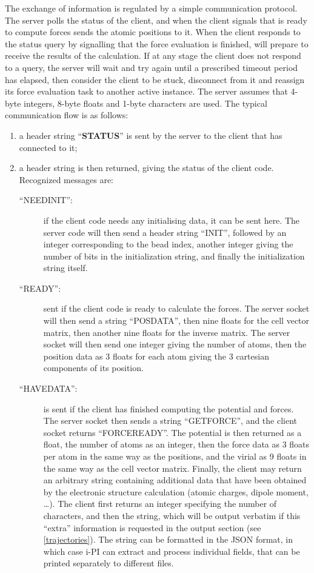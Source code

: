 \documentclass[11pt,english,fleqn]{report}
\begin{document}
The exchange of information is regulated by a simple 
communication protocol. The server polls the status of the client,
and when the client signals that is ready to compute forces 
\ipi sends the atomic positions to it. When the client responds to the
status query by signalling that the force evaluation is finished,
\ipi will prepare to receive the results of the calculation.
 If at any stage the client does not respond to a query, the server 
will wait and try again until a prescribed timeout period has elapsed, 
then consider the client to be stuck, disconnect from it 
and reassign its force evaluation task to another active instance. 
The server assumes that 4-byte integers, 8-byte floats
and 1-byte characters are used. The typical communication flow is
as follows:
%
\begin{enumerate}
\item a header string {}``\textbf{STATUS}'' is sent by the server to 
the client that has connected to it;
\item a header string is then returned, giving the status of the client
code. Recognized messages are:
\begin{description}
\item [{{}``NEEDINIT'':}] if the client code needs any initialising data,
it can be sent here. The server code will then send a header string
{}``INIT'', followed by an integer corresponding to the bead index,
another integer giving the number of bits in
the initialization string, and finally the initialization string itself.
\item [{{}``READY'':}] sent if the client code is ready to calculate
the forces. The server socket will then send a string {}``POSDATA'',
then nine floats for the cell vector matrix, then another nine floats
for the inverse matrix. The server socket will then send one
integer giving the number of atoms, then the position data as 3 floats
for each atom giving the 3 cartesian components of its position.
\item [{{}``HAVEDATA'':}] is sent if the client has finished computing the
potential and forces. The server socket then sends a string {}``GETFORCE'',
and the client socket returns {}``FORCEREADY''. The potential is
then returned as a float, the number of atoms as an integer, then
the force data as 3 floats per atom in the same way as the positions,
and the virial as 9 floats in the same way as the cell vector matrix. 
Finally, the client may return an arbitrary string containing additional
data that have been obtained by the electronic structure calculation 
(atomic charges, dipole moment, \ldots). The client first returns
an integer specifying the number of characters, and then the string,
which will be output verbatim if this ``extra'' information is
requested in the output section (see \ref{trajectories}).
The string can be formatted in the JSON format, in which case i-PI
can extract and process individual fields, that can be printed separately
to different files.


\end{description}
\end{enumerate}
\end{document}
